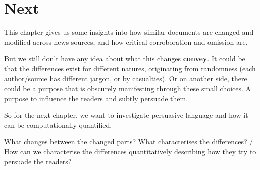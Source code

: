 \section{Next}
\label{sec:cgs_next}

This chapter gives us some insights into how similar documents are changed and modified across news sources, and how critical corroboration and omission are.



But we still don't have any idea about what this changes \textbf{convey}. It could be that the differences exist for different natures, originating from randomness (each author/source has different jargon, or by casualties).
Or on another side, there could be a purpose that is obscurely manifesting through these small choices. A purpose to influence the readers and subtly persuade them.

So for the next chapter, we want to investigate persuasive language and how it can be computationally quantified. 

What changes between the changed parts? What characterises the differences? / How can we characterise the differences quantitatively describing how they try to persuade the readers?
